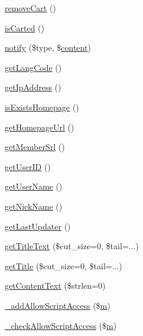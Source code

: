 \begin{DoxyCompactItemize}
\item 
\hyperlink{classdocumentItem_aa66932772c39aeff91238badd8246969}{remove\+Cart} ()
\item 
\hyperlink{classdocumentItem_a505c87502da3ca4b656230125ffa4f1e}{is\+Carted} ()
\item 
\hyperlink{classdocumentItem_afbccc4d35ce638fac62221e5602cc750}{notify} (\$type, \$\hyperlink{classcontent}{content})
\item 
\hyperlink{classdocumentItem_a7491640a855ace286820cb11f273ddb6}{get\+Lang\+Code} ()
\item 
\hyperlink{classdocumentItem_ac0e9b0006f067bc0918751148606d325}{get\+Ip\+Address} ()
\item 
\hyperlink{classdocumentItem_a7cc882ce0da6cbe675be8fdb980a0d97}{is\+Exists\+Homepage} ()
\item 
\hyperlink{classdocumentItem_ab9117599bb123e83289d2a24fd44bf50}{get\+Homepage\+Url} ()
\item 
\hyperlink{classdocumentItem_a75af5f05bd55c32bdc6c17dd8511e4e8}{get\+Member\+Srl} ()
\item 
\hyperlink{classdocumentItem_a66a8157a3cc7c82325eadcefe6390a58}{get\+User\+ID} ()
\item 
\hyperlink{classdocumentItem_a072696b683278c84bc3ebfee46d4216f}{get\+User\+Name} ()
\item 
\hyperlink{classdocumentItem_ab91ca9e1defb1a570212baa4f380706a}{get\+Nick\+Name} ()
\item 
\hyperlink{classdocumentItem_a784effc9e694d82da32e06e95482ff28}{get\+Last\+Updater} ()
\item 
\hyperlink{classdocumentItem_aad953dc30cf01a1d451cb90c66c09b0c}{get\+Title\+Text} (\$cut\+\_\+size=0, \$tail=\textquotesingle{}...\textquotesingle{})
\item 
\hyperlink{classdocumentItem_a365509266cc36e56b66df824bc2fcbfc}{get\+Title} (\$cut\+\_\+size=0, \$tail=\textquotesingle{}...\textquotesingle{})
\item 
\hyperlink{classdocumentItem_acdef9404e1dc50d82456fb112212e23e}{get\+Content\+Text} (\$strlen=0)
\item 
\hyperlink{classdocumentItem_a6bc6bbe65e83e9bfc03bae1fea5b75d7}{\+\_\+add\+Allow\+Script\+Access} (\$\hyperlink{jqplot_8barRenderer_8min_8js_a10e752a52784980deba83e0ae1cb7cf1}{m})
\item 
\hyperlink{classdocumentItem_a0d88d945333c887802ad1f8442f5d5c7}{\+\_\+check\+Allow\+Script\+Access} (\$\hyperlink{jqplot_8barRenderer_8min_8js_a10e752a52784980deba83e0ae1cb7cf1}{m})
\item 

\end{DoxyCompactItemize}
